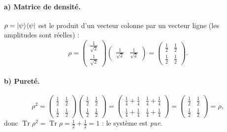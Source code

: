 \paragraph{a) Matrice de densité.} $\rho=|\psi\rangle\langle \psi|$ est le produit d'un vecteur
colonne par un vecteur ligne (les amplitudes sont réelles) :
\[
  \rho=\begin{pmatrix}\frac{1}{\sqrt2}\\[0.4ex]\frac{1}{\sqrt2}\end{pmatrix}
       \begin{pmatrix}\frac{1}{\sqrt2}&\frac{1}{\sqrt2}\end{pmatrix}
  =\begin{pmatrix}\frac12&\frac12\\[0.4ex]\frac12&\frac12\end{pmatrix}.
\]

\paragraph{b) Pureté.}
\[
  \rho^2=\begin{pmatrix}\frac12&\frac12\\[0.4ex]\frac12&\frac12\end{pmatrix}
         \begin{pmatrix}\frac12&\frac12\\[0.4ex]\frac12&\frac12\end{pmatrix}
  =\begin{pmatrix}\frac14+\frac14&\frac14+\frac14\\[0.4ex]\frac14+\frac14&\frac14+\frac14\end{pmatrix}
  =\begin{pmatrix}\frac12&\frac12\\[0.4ex]\frac12&\frac12\end{pmatrix}=\rho,
\]
donc $\operatorname{Tr}\rho^2=\operatorname{Tr}\rho=\frac12+\frac12=1$ : le système est \emph{pur}.

